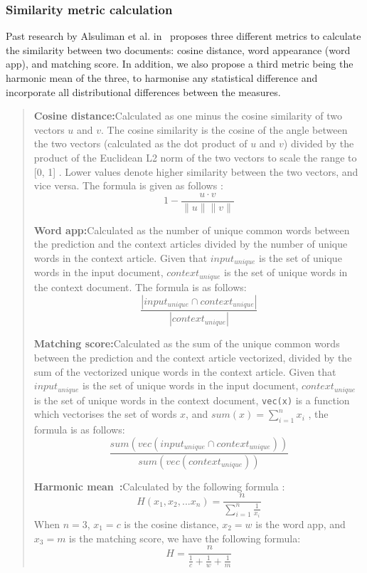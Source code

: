 \documentclass{article}
\begin{document}
\subsubsection{Similarity metric calculation} \label{section:similarity-metric}

Past research by Alsuliman et al. in~\cite{alsuliman2022social} proposes three different metrics to calculate the similarity between two documents: cosine distance, word appearance (word app), and matching score. In addition, we also propose a third metric being the harmonic mean of the three, to harmonise any statistical difference and incorporate all distributional differences between the measures.

\begin{quote}
  \textbf{Cosine distance:}\quad Calculated as one minus the cosine similarity of two vectors $u$ and $v$. The cosine similarity is the cosine of the angle between the two vectors (calculated as the dot product of $u$ and $v$) divided by the product of the Euclidean L2 norm of the two vectors to scale the range to [0, 1] \cite{scikit-learn}. Lower values denote higher similarity between the two vectors, and vice versa. The formula is given as follows \cite{scipy}:
  \[ 1 - \frac{u \cdot v}{\lVert u \rVert \lVert v \rVert}\]

  \textbf{Word app:}\quad Calculated as the number of unique common words between the prediction and the context articles divided by the number of unique words in the context article. Given that \texttt{$input_{unique}$} is the set of unique words in the input document, \texttt{$context_{unique}$} is the set of unique words in the context document. The formula is as follows:
  \[\frac{\left|input_{unique} \cap context_{unique}\right|}{\left|context_{unique}\right|}\]

  \textbf{Matching score:}\quad Calculated as the sum of the unique common words between the prediction and the context article vectorized, divided by the sum of the vectorized unique words in the context article. Given that \texttt{$input_{unique}$} is the set of unique words in the input document, \texttt{$context_{unique}$} is the set of unique words in the context document, \texttt{vec(x)} is a function which vectorises the set of words $x$, and $sum(x) = \sum_{i=1}^n x_i$ , the formula is as follows:
  \[\frac{sum(vec(input_{unique} \cap context_{unique}))}{sum(vec(context_{unique}))}\]

  \textbf{Harmonic mean~\cite{harmonic_mean}:}\quad Calculated by the following formula :
  \[H(x_1, x_2, ... x_n) = \frac{n}{\sum^n_{i=1}\frac{1}{x_i}}\]
  When $n = 3$, $x_1 = c$ is the cosine distance, $x_2 = w$ is the word app, and $x_3 = m$ is the matching score, we have the following formula:
  \[H = \frac{n}{\frac{1}{c} + \frac{1}{w} + \frac{1}{m}}\]
\end{quote}
\end{document}
